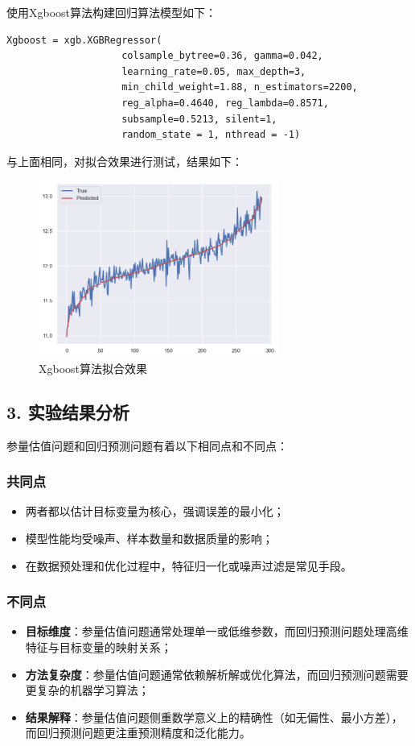\documentclass[12pt]{ctexart}
\begin{document}
使用Xgboost算法构建回归算法模型如下：

\begin{lstlisting}
Xgboost = xgb.XGBRegressor(
                    colsample_bytree=0.36, gamma=0.042, 
                    learning_rate=0.05, max_depth=3, 
                    min_child_weight=1.88, n_estimators=2200,
                    reg_alpha=0.4640, reg_lambda=0.8571,
                    subsample=0.5213, silent=1,
                    random_state = 1, nthread = -1)
\end{lstlisting}

与上面相同，对拟合效果进行测试，结果如下：

\begin{figure}[H]
    \centering
    \includegraphics[width=0.7\textwidth]{image/output4-10.png}
    \caption{Xgboost算法拟合效果}
\end{figure} 

\subsection*{3. 实验结果分析}

参量估值问题和回归预测问题有着以下相同点和不同点：

\subsubsection*{共同点}
\begin{itemize}
    \item 两者都以估计目标变量为核心，强调误差的最小化；
    \item 模型性能均受噪声、样本数量和数据质量的影响；
    \item 在数据预处理和优化过程中，特征归一化或噪声过滤是常见手段。
\end{itemize}

\subsubsection*{不同点}
\begin{itemize}
    \item \textbf{目标维度}：参量估值问题通常处理单一或低维参数，而回归预测问题处理高维特征与目标变量的映射关系；
    \item \textbf{方法复杂度}：参量估值问题通常依赖解析解或优化算法，而回归预测问题需要更复杂的机器学习算法；
    \item \textbf{结果解释}：参量估值问题侧重数学意义上的精确性（如无偏性、最小方差），而回归预测问题更注重预测精度和泛化能力。
\end{itemize}
\end{document}
